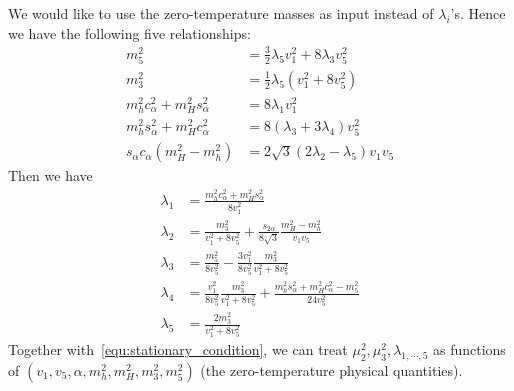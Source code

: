 \documentclass[12pt]{article}
\begin{document}
We would like to use the zero-temperature masses as input instead of $\lambda_i$'s. Hence we have the following five relationships:
\begin{subequations}
    \begin{align}
        m_5^2 &= \frac{3}{2}\lambda_5v_1^2 + 8\lambda_3 v_5^2\\
        m_3^2 &= \frac{1}{2}\lambda_5(v_1^2 + 8v_5^2) \\
        m_h^2c_\alpha^2 + m_H^2 s_\alpha^2 &= 8\lambda_1v_1^2 \\
        m_h^2s_\alpha^2 + m_H^2 c_\alpha^2 &= 8(\lambda_3+3\lambda_4)v_5^2\\
        s_\alpha c_\alpha (m_H^2 - m_h^2) &= 2\sqrt{3}(2\lambda_2-\lambda_5)v_1 v_5
    \end{align}
\end{subequations}
Then we have
\begin{subequations}
    \begin{align}
        \lambda_1 &= \frac{m_h^2 c_\alpha^2 + m_H^2 s_\alpha^2}{8v_1^2}\\
        \lambda_2 &= \frac{m_3^2}{v_1^2 + 8 v_5^2} + \frac{s_{2\alpha}}{8\sqrt{3}}\frac{m_H^2-m_h^2}{v_1v_5}\\
        \lambda_3 &= \frac{m_5^2}{8v_5^2} - \frac{3v_1^2}{8v_5^2}\frac{m_3^2}{v_1^2+8v_5^2}\\
        \lambda_4 &= \frac{v_1^2}{8v_5^2}\frac{m_3^2}{v_1^2+8v_5^2}+\frac{m_h^2s_\alpha^2+m_H^2c_\alpha^2-m_5^2}{24v_5^2}\\
        \lambda_5 &= \frac{2m_3^2}{v_1^2+8v_5^2}
    \end{align}
\end{subequations}
Together with~\autoref{equ:stationary_condition}, we can treat $\mu_2^2,\mu_3^2,\lambda_{1,\cdots,5}$ as functions of $(v_1,v_5,\alpha,m_h^2,m_H^2,m_3^2,m_5^2)$ (the zero-temperature physical quantities).
\end{document}
